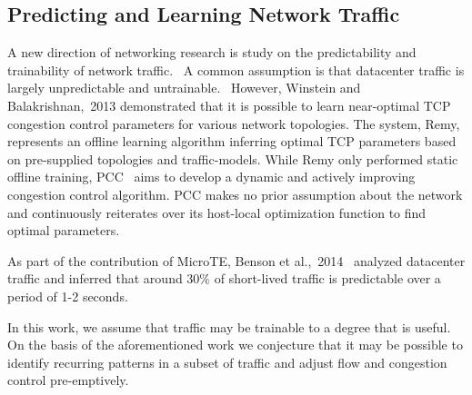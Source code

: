 \subsection{Predicting and Learning Network Traffic}
A new direction of networking research is study on the predictability and 
trainability of network traffic.~\cite{throwdown, learning_tcp}
A common assumption is that datacenter traffic is largely unpredictable and 
untrainable.~\cite{fb_dc}
However, Winstein and Balakrishnan,~2013 \cite{remy} demonstrated that it is 
possible to learn near-optimal TCP congestion control parameters for various 
network topologies. The system, Remy, represents an offline learning algorithm 
inferring optimal TCP parameters based on pre-supplied topologies and 
traffic-models.
While Remy only performed static offline training, PCC~\cite{pcc,throwdown} 
aims to develop a dynamic and actively improving congestion control algorithm. 
PCC makes no prior assumption about the network and continuously reiterates over
its host-local optimization function to find optimal parameters.

As part of the contribution of MicroTE, Benson et 
al.,~2014~\cite{microte} analyzed datacenter traffic and 
inferred that around 30\% of short-lived traffic is predictable over a period 
of 1-2 seconds.

In this work, we assume that traffic may be trainable to a degree that is 
useful. On the basis of the aforementioned work we conjecture that it may be 
possible to identify recurring patterns in a subset of traffic and adjust flow 
and congestion control pre-emptively.
